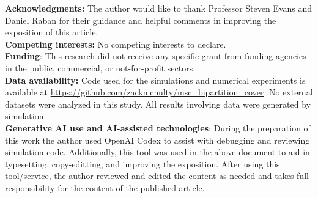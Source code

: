 \documentclass[10pt,oneside,reqno]{article}
\theoremstyle{plain}
\theoremstyle{definition}
\numberwithin{equation}{section}
\begin{document}
\noindent \textbf{Acknowledgments:} The author would like to thank Professor Steven Evans and Daniel Raban for their guidance and helpful comments in improving the exposition of this article.\\

\noindent\textbf{Competing interests:} No competing interests to declare.\\

\noindent \textbf{Funding}: This research did not receive any specific grant from funding agencies in the public, commercial, or not-for-profit sectors.\\

\noindent\textbf{Data availability:} Code used for the simulations and numerical experiments is available at \url{https://github.com/zackmcnulty/msc_bipartition_cover}. No external datasets were analyzed in this study. All results involving data were generated by simulation.\\

\noindent \textbf{Generative AI use and AI-assisted technologies}: During the preparation of this work the author used OpenAI Codex to assist with debugging and 
reviewing simulation code. Additionally, this tool was used in the above document to aid in typesetting, copy-editting, and improving the exposition. 
After using this tool/service, the author reviewed and edited the content as needed and takes full responsibility for the content of the published article.



\newpage 


\end{document}
